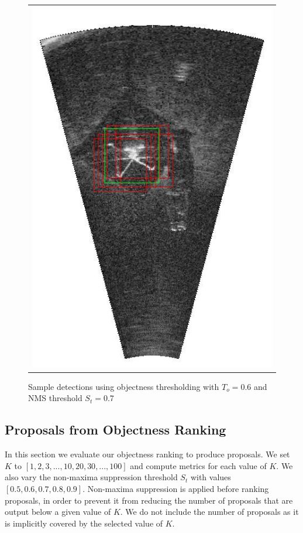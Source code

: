 \begin{figure}[p]
{\begin{tabular}[b]{c}
		\includegraphics[height=0.22\textheight]{chapters/images/proposals/detections/fcn-nms070-2016-02-11_070611-frame16021-proposals.jpg}
        \end{tabular}
	}	
	\vspace*{-1.0cm}
	\caption{Sample detections using objectness thresholding with $T_o = 0.6$ and NMS threshold $S_t = 0.7$}
	\label{proposals:thresholdDetectionSamples}
\end{figure}

\subsection{Proposals from Objectness Ranking}

In this section we evaluate our objectness ranking to produce proposals. We set $K$ to $[1, 2, 3, ..., 10, 20, 30, ... ,100]$ and compute metrics for each value of $K$. We also vary the non-maxima suppression threshold $S_t$ with values $[0.5, 0.6, 0.7, 0.8, 0.9]$. Non-maxima suppression is applied before ranking proposals, in order to prevent it from reducing the number of proposals that are output below a given value of $K$. We do not include the number of proposals as it is implicitly covered by the selected value of $K$.

